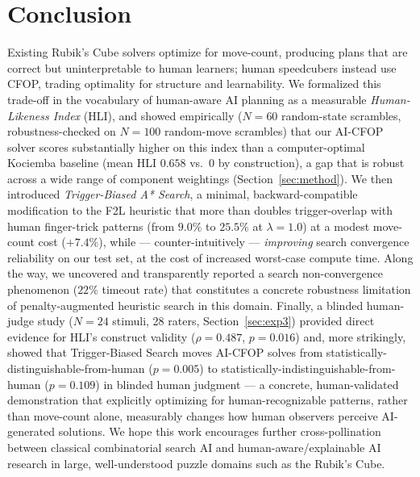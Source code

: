 \documentclass[10pt,conference]{article}
\begin{document}
\section{Conclusion}
Existing Rubik's Cube solvers optimize for move-count, producing
plans that are correct but uninterpretable to human learners; human
speedcubers instead use CFOP, trading optimality for structure and
learnability. We formalized this trade-off in the vocabulary of
human-aware AI planning as a measurable \emph{Human-Likeness Index}
(HLI), and showed empirically ($N=60$ random-state scrambles,
robustness-checked on $N=100$ random-move scrambles) that our
AI-CFOP solver scores substantially higher on this index than a
computer-optimal Kociemba baseline (mean HLI $0.658$ vs.\ $0$ by
construction), a gap that is robust across a wide range of
component weightings (Section~\ref{sec:method}). We then introduced
\emph{Trigger-Biased A* Search}, a minimal, backward-compatible
modification to the F2L heuristic that more than doubles
trigger-overlap with human finger-trick patterns (from $9.0\%$ to
$25.5\%$ at $\lambda=1.0$) at a modest move-count cost ($+7.4\%$),
while --- counter-intuitively --- \emph{improving} search
convergence reliability on our test set, at the cost of increased
worst-case compute time. Along the way, we uncovered and
transparently reported a search non-convergence phenomenon
($22\%$ timeout rate) that constitutes a concrete robustness
limitation of penalty-augmented heuristic search in this domain.
Finally, a blinded human-judge study ($N=24$ stimuli, 28 raters,
Section~\ref{sec:exp3}) provided direct evidence for HLI's construct
validity ($\rho=0.487$, $p=0.016$) and, more strikingly, showed that
Trigger-Biased Search moves AI-CFOP solves from
statistically-distinguishable-from-human ($p=0.005$) to
statistically-indistinguishable-from-human ($p=0.109$) in blinded
human judgment --- a concrete, human-validated demonstration that
explicitly optimizing for human-recognizable patterns, rather than
move-count alone, measurably changes how human observers perceive
AI-generated solutions. We hope this work encourages further
cross-pollination between classical combinatorial search AI and
human-aware/explainable AI research in large, well-understood puzzle
domains such as the Rubik's Cube.
\end{document}
